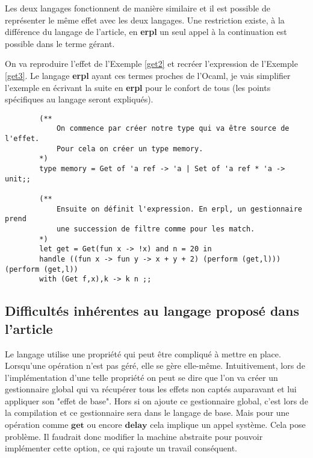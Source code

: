 Les deux langages fonctionnent de manière similaire et il est possible de représenter le même effet
avec les deux langages. Une restriction existe, à la différence du langage de l'article, en \textbf{erpl}
un seul appel à la continuation est possible dans le terme gérant.

\begin{exemple}
    On va reproduire l'effet de l'Exemple \ref{get2} et recréer l'expression de l'Exemple \ref{get3}. 
    Le langage \textbf{erpl} ayant ces termes proches de l'Ocaml, je vais simplifier l'exemple en 
    écrivant la suite en \textbf{erpl} pour le confort de tous (les points spécifiques au langage seront expliqués).
    

    \begin{verbatim}
        (** 
            On commence par créer notre type qui va être source de l'effet. 
            Pour cela on créer un type memory.
        *)
        type memory = Get of 'a ref -> 'a | Set of 'a ref * 'a -> unit;;

        (**
            Ensuite on définit l'expression. En erpl, un gestionnaire prend
            une succession de filtre comme pour les match.
        *)
        let get = Get(fun x -> !x) and n = 20 in
        handle ((fun x -> fun y -> x + y + 2) (perform (get,l))) (perform (get,l)) 
        with (Get f,x),k -> k n ;;
    \end{verbatim}

\end{exemple}

\subsection{Difficultés inhérentes au langage proposé dans l'article}

Le langage utilise une propriété qui peut être compliqué à mettre en place. Lorsqu'une opération
n'est pas géré, elle se gère elle-même. Intuitivement, lors de l'implémentation d'une telle propriété
on peut se dire que l'on va créer un gestionnaire global qui va récupérer tous les effets non captés auparavant
et lui appliquer son "effet de base". Hors si on ajoute ce gestionnaire global, c'est lors de la compilation et 
ce gestionnaire sera dans le langage de base. Mais pour une opération comme $\textbf{get}$ ou encore $\textbf{delay}$ 
cela implique un appel système. Cela pose problème. Il faudrait donc modifier la machine abstraite pour pouvoir
implémenter cette option, ce qui rajoute un travail conséquent.